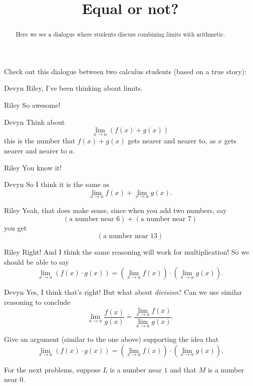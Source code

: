 \documentclass{ximera}
\title[Break-Ground:]{Equal or not?}
\begin{document}
\begin{abstract}
Here we see a dialogue where students discuss combining limits with
arithmetic.
\end{abstract}
\maketitle


Check out this dialogue between two calculus students (based on a true
story):

\begin{dialogue}
\item[Devyn] Riley, I've been thinking about limits.
\item[Riley] So awesome!
\item[Devyn] Think about
  \[
  \lim_{x\to a} \left(f(x) + g(x)\right)
  \]
  this is the number that $f(x) + g(x)$ gets nearer and nearer to, as $x$ gets nearer and nearer to $a$. 
\item[Riley] You know it!
\item[Devyn] So I think it is the same as
  \[
  \lim_{x\to a} f(x) + \lim_{x\to a}g(x).
  \]
\item[Riley] Yeah, that does make sense, since when you add two
  numbers, say
  \[
  (\text{a number near $6$}) + (\text{a number near $7$})
  \]
  you get
  \[
  (\text{a number near $13$})
  \]
\item[Riley] Right! And I think the same reasoning will work for
  multiplication! So we should be able to say
  \[
  \lim_{x\to a}\left(f(x) \cdot g(x)\right) = \left(\lim_{x\to a} f(x) \right)\cdot\left(\lim_{x\to a} g(x)\right).
  \]
\item[Devyn] Yes, I think that's right! But what about
  \textit{division}? Can we use similar reasoning to conclude
  \[
  \lim_{x\to a} \frac{f(x)}{g(x)} = \frac{\lim_{x\to a}
    f(x)}{\lim_{x\to a} g(x)}.
  \]
\end{dialogue}



\begin{problem}
  Give an argument (similar to the one above) supporting the idea that
  \[
  \lim_{x\to a}\left(f(x) \cdot g(x)\right) = \left(\lim_{x\to a} f(x) \right)\cdot\left(\lim_{x\to a} g(x)\right).
  \]
  \begin{freeResponse}
  \end{freeResponse}
\end{problem}


For the next problems, suppose $L$ is a number near $1$ and that $M$
is a number near $0$.
\end{document}
